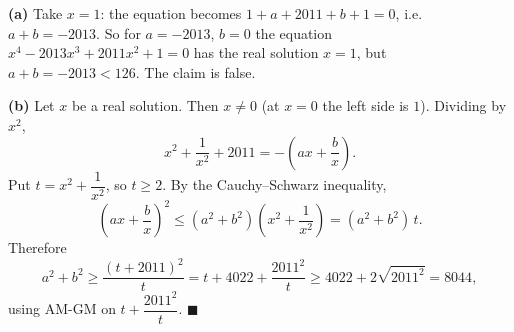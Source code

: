 \textbf{(a)} Take $x=1$: the equation becomes $1+a+2011+b+1=0$, i.e.\ $a+b=-2013$. So for $a=-2013$, $b=0$ the equation $x^4-2013x^3+2011x^2+1=0$ has the real solution $x=1$, but $a+b=-2013<126$. The claim is false.

\textbf{(b)} Let $x$ be a real solution. Then $x\ne0$ (at $x=0$ the left side is $1$). Dividing by $x^2$,
\[
x^2+\dfrac{1}{x^2}+2011=-\left(ax+\dfrac {b}{x}\right).
\]
Put $t=x^2+\dfrac{1}{x^2}$, so $t\ge2$. By the Cauchy--Schwarz inequality,
\[
\left(ax+\dfrac {b}{x}\right)^2\le(a^2+b^2)\left(x^2+\dfrac{1}{x^2}\right)=(a^2+b^2)\,t .
\]
Therefore
\[
a^2+b^2\ge\dfrac{(t+2011)^2}{t}=t+4022+\dfrac{2011^2}{t}\ge4022+2\sqrt{2011^2}=8044,
\]
using AM-GM on $t+\dfrac{2011^2}{t}$. $\blacksquare$
